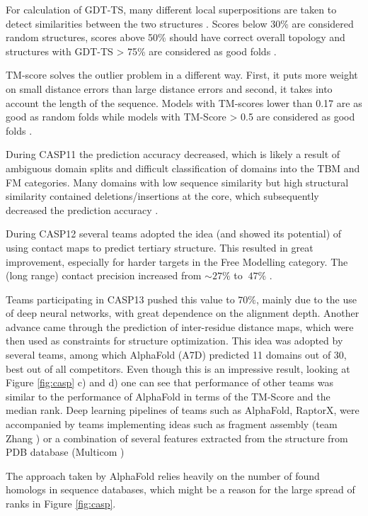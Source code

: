 For calculation of GDT-TS, many different local superpositions are taken to detect similarities between the two structures \cite{gdt1}. 
Scores below 30\% are considered random structures, scores above 50\% should have correct overall topology and structures with GDT-TS > 75\% are considered as good folds \cite{casp13}.

TM-score solves the outlier problem in a different way. 
First, it puts more weight on small distance errors than large distance errors and second, it takes into account the length of the sequence. 
Models with TM-scores lower than 0.17 are as good as random folds while models with TM-Score > 0.5 are considered as good folds \cite{tmscore}.

During CASP11 the prediction accuracy decreased, which is likely a result of ambiguous domain splits and difficult classification of domains into the TBM and FM categories. 
Many domains with low sequence similarity but high structural similarity contained deletions/insertions at the core, which subsequently decreased the prediction accuracy \cite{casp11}.

During CASP12 several teams adopted the idea (and showed its potential) of using contact maps to predict tertiary structure. 
This resulted in great improvement, especially for harder targets in the Free Modelling category. 
The (long range) contact precision increased from $\sim 27\%$ to $~47\%$ \cite{casp12}.

Teams participating in CASP13 pushed this value to $70\%$, mainly due to the use of deep neural networks, with great dependence on the alignment depth. 
Another advance came through the prediction of inter-residue distance maps, which were then used as constraints for structure optimization. 
This idea was adopted by several teams, among which AlphaFold (A7D) predicted 11 domains out of 30, best out of all competitors. 
Even though this is an impressive result, looking at Figure \ref{fig:casp} c) and d) one can see that performance of other teams was similar to the performance of AlphaFold in terms of the TM-Score and the median rank. 
Deep learning pipelines of teams such as AlphaFold, RaptorX, were accompanied by teams implementing ideas such as fragment assembly (team Zhang \cite{zhang}) or a combination of several features extracted from the structure from PDB database (Multicom \cite{multicom0})

The approach taken by AlphaFold relies heavily on the number of found homologs in sequence databases, which might be a reason for the large spread of ranks in Figure \ref{fig:casp}.
